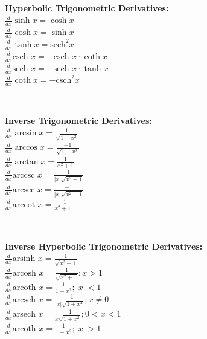 \\ \begin{minipage}{\textwidth}
    \textbf{Hyperbolic Trigonometric Derivatives:}
    \\ \( \displaystyle\frac{ d }{ dx } \sinh x = \cosh x \)
    \\ \( \displaystyle\frac{ d }{ dx } \cosh x = \sinh x \)
    \\ \( \displaystyle\frac{ d }{ dx } \tanh x = \text{sech}^2 x \)
    \\ \( \displaystyle\frac{ d }{ dx } \text{csch } x = - \text{csch } x \cdot \coth x \)
    \\ \( \displaystyle\frac{ d }{ dx } \text{sech } x = - \text{sech } x \cdot \tanh x \)
    \\ \( \displaystyle\frac{ d }{ dx } \coth x = - \text{csch}^2 x \)
\end{minipage}
\\ \begin{minipage}{\textwidth}
    \textbf{Inverse Trigonometric Derivatives:}
    \\ \( \displaystyle\frac{ d }{ dx } \arcsin x = \displaystyle\frac{ 1 }{ \sqrt{ 1 - x^2 } } \)
    \\ \( \displaystyle\frac{ d }{ dx } \arccos x = \displaystyle\frac{ -1 }{ \sqrt{ 1 - x^2 } } \)
    \\ \( \displaystyle\frac{ d }{ dx } \arctan x = \displaystyle\frac{ 1 }{ x^2 + 1 } \)
    \\ \( \displaystyle\frac{ d }{ dx } \text{arccsc } x = \displaystyle\frac{ 1 }{ | x | \sqrt{ x^2 - 1 } } \)
    \\ \( \displaystyle\frac{ d }{ dx } \text{arcsec } x = \displaystyle\frac{ -1 }{ | x | \sqrt{ x^2 - 1 } } \)
    \\ \( \displaystyle\frac{ d }{ dx } \text{arccot } x = \displaystyle\frac{ -1 }{ x^2 + 1 } \)
\end{minipage}
\\ \begin{minipage}{\textwidth}
    \textbf{Inverse Hyperbolic Trigonometric Derivatives:}
    \\ \( \displaystyle\frac{ d }{ dx } \text{arsinh } x = \displaystyle\frac{ 1 }{ \sqrt{ x^2 + 1 } } \)
    \\ \( \displaystyle\frac{ d }{ dx } \text{arcosh } x = \displaystyle\frac{ 1 }{ \sqrt{ x^2 + 1 } } ; x > 1 \)
    \\ \( \displaystyle\frac{ d }{ dx } \text{arcoth } x = \displaystyle\frac{ 1 }{ 1 - x^2 } ; | x | < 1 \)
    \\ \( \displaystyle\frac{ d }{ dx } \text{arcsch } x = \displaystyle\frac{ -1 }{ | x | \sqrt{ 1 + x^2 } } ; x \neq 0 \)
    \\ \( \displaystyle\frac{ d }{ dx } \text{arsech } x = \displaystyle\frac{ -1 }{ x \sqrt{ 1 + x^2 } } ; 0 < x < 1 \)
    \\ \( \displaystyle\frac{ d }{ dx } \text{arcoth } x = \displaystyle\frac{ 1 }{ 1 - x^2 } ; | x | > 1 \)
\end{minipage}